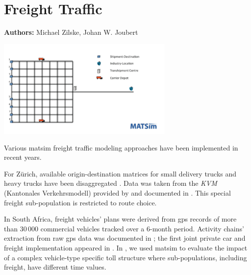 \chapter{Freight Traffic}
\label{ch:freight}

\hfill \textbf{Authors:} Michael Zilske, Johan W. Joubert

\begin{center} \includegraphics[width=0.65\textwidth, angle=0]{extending/figures/freightcarriers} \end{center}



Various \gls{matsim} freight traffic modeling approaches have been implemented in recent years. 

For Zürich, available origin-destination matrices for small delivery trucks and heavy trucks have been disaggregated \citet[][]{ShahM_TechRep_IVT_2010}. Data was taken from the \emph{KVM} (Kantonales Verkehrsmodell) provided by \citet{AMV_Webpage_2011} and documented in \citet[][]{GottardiBuergler_SV_1999}. This special freight sub-population is restricted to route choice.

In South Africa, freight vehicles' plans were derived from \gls{gps} records of more than 30\,000 commercial vehicles tracked over a 6-month period.  Activity chains' extraction from raw \gls{gps} data was documented in \citet[][]{JoubertAxhausen_JTG_2011}; the first joint private car and freight implementation appeared in \citet[][]{JoubertJEtAl_TRR_2010}. In \citet[][]{NagelKickhoeferJoubert2014HeterogeneousVoTsPROCEDIA}, we used \gls{matsim} to evaluate the impact of a complex vehicle-type specific toll structure where sub-populations, including freight, have different time values.

